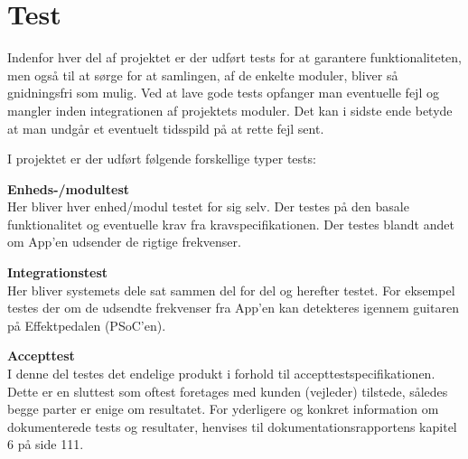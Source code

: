 \section{Test}

\label{chap:test}

Indenfor hver del af projektet er der udført tests for at garantere funktionaliteten, men også til at sørge for at samlingen, af de enkelte moduler, bliver så gnidningsfri som mulig. Ved at lave gode tests opfanger man eventuelle fejl og mangler inden integrationen af projektets moduler. Det kan i sidste ende betyde at man undgår et eventuelt tidsspild på at rette fejl sent.


I projektet er der udført følgende forskellige typer tests:


\textbf{Enheds-/modultest} \\
Her bliver hver enhed/modul testet for sig selv. Der testes på den basale funktionalitet og eventuelle krav fra kravspecifikationen. Der testes blandt andet om App’en udsender de rigtige frekvenser.


\textbf{Integrationstest} \\
Her bliver systemets dele sat sammen del for del og herefter testet. For eksempel testes der om de udsendte frekvenser fra App’en kan detekteres igennem guitaren på Effektpedalen (PSoC’en).


\textbf{Accepttest} \\
I denne del testes det endelige produkt i forhold til accepttestspecifikationen. Dette er en sluttest som oftest foretages med kunden (vejleder) tilstede, således begge parter er enige om resultatet.
For yderligere og konkret information om dokumenterede tests og resultater, henvises til dokumentationsrapportens kapitel 6 på side 111.